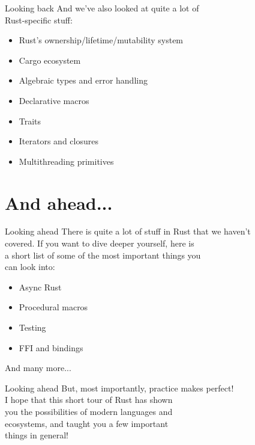 \documentclass[usenames,dvipsnames,10pt,aspectratio=169]{beamer}
\begin{document}
\begin{frame}{Looking back}
	\large
	And we've also looked at quite a lot of\\
	Rust-specific stuff:
	\vspace{0.1cm}
\begin{itemize}[label=$\bullet$]
	\item Rust's ownership/lifetime/mutability system
	\item Cargo ecosystem
	\item Algebraic types and error handling
	\item Declarative macros
	\item Traits
	\item Iterators and closures
	\item Multithreading primitives
\end{itemize}
\end{frame}

\section{And ahead...}

\begin{frame}{Looking ahead}
	\large
There is quite a lot of stuff in Rust that we haven't\\
covered. If you want to dive deeper yourself, here is\\
a short list of some of the most important things you\\
can look into:
\vspace{0.2cm}
\begin{itemize}[label=$\bullet$]
	\item Async Rust
	\item Procedural macros
	\item Testing
	\item FFI and bindings
\end{itemize}
\vspace{0.2cm}
And many more...
\end{frame}

\begin{frame}{Looking ahead}
\Large
But, most importantly, practice makes perfect!\\

\vspace{0.4cm}
I hope that this short tour of Rust has shown\\
you the possibilities of modern languages and\\
ecosystems, and taught you a few important\\
things in general!
\end{frame}

\end{document}
